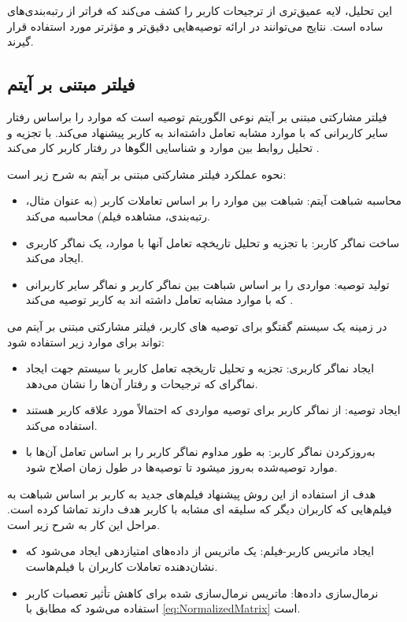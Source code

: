 \begin{enumerate}
\begin{itemize}
\end{itemize}

این تحلیل، لایه عمیق‌تری از ترجیحات کاربر را کشف می‌کند که فراتر از رتبه‌بندی‌های ساده است. نتایج می‌توانند در ارائه توصیه‌هایی دقیق‌تر و مؤثرتر مورد استفاده قرار گیرند.

\subsection{فیلتر مبتنی بر آیتم}


فیلتر مشارکتی مبتنی بر آیتم%
 نوعی الگوریتم توصیه است که موارد را براساس رفتار سایر کاربرانی که با موارد مشابه تعامل داشته‌اند به کاربر پیشنهاد می‌کند. با تجزیه و تحلیل روابط بین موارد و شناسایی الگوها در رفتار کاربر کار می‌کند %
\cite{abdalla2023boosting}
.

نحوه عملکرد فیلتر مشارکتی مبتنی بر آیتم به شرح زیر است:
\begin{itemize}
\item
محاسبه شباهت آیتم: شباهت بین موارد را بر اساس تعاملات کاربر (به عنوان مثال، رتبه‌بندی، مشاهده فیلم) محاسبه می‌کند.
\item
ساخت نماگر کاربر: با تجزیه و تحلیل تاریخچه تعامل آنها با موارد، یک نماگر کاربری ایجاد می‌کند.
\item
تولید توصیه: مواردی را بر اساس شباهت بین نماگر کاربر و نماگر سایر کاربرانی که با موارد مشابه تعامل داشته اند به کاربر توصیه می‌کند
\cite{dwivedi2023item}
.

\end{itemize}


در زمینه یک سیستم گفتگو برای توصیه های کاربر، فیلتر مشارکتی مبتنی بر آیتم می تواند برای موارد زیر استفاده شود:
\begin{itemize}
\item
ایجاد نماگر کاربری:  تجزیه و تحلیل تاریخچه تعامل کاربر با سیستم جهت ایجاد نماگر‌ای که ترجیحات و رفتار آن‌ها را نشان می‌دهد.
\item
ایجاد توصیه: از نماگر کاربر برای توصیه مواردی که احتمالاً مورد علاقه کاربر هستند استفاده می‌کند.
\item
به‌روزکردن نماگر کاربر: به طور مداوم نماگر کاربر را بر اساس تعامل آن‌ها با موارد توصیه‌شده به‌روز میشود تا توصیه‌ها در طول زمان اصلاح شود.
\end{itemize}

هدف از استفاده از این روش  پیشنهاد فیلم‌های جدید به کاربر بر اساس شباهت به فیلم‌هایی که کاربران دیگر که سلیقه ای مشابه با کاربر هدف دارند تماشا کرده است. مراحل این کار به شرح زیر است.
\begin{itemize}
\item
ایجاد ماتریس کاربر-فیلم:  یک ماتریس از داده‌های امتیازدهی ایجاد می‌شود که نشان‌دهنده تعاملات کاربران با فیلم‌هاست.
\item
نرمال‌سازی داده‌ها: ماتریس نرمال‌سازی شده برای کاهش تأثیر تعصبات کاربر استفاده می‌شود که مطابق با 
\ref{eq:NormalizedMatrix}
 است.


\end{itemize}
\end{enumerate}
